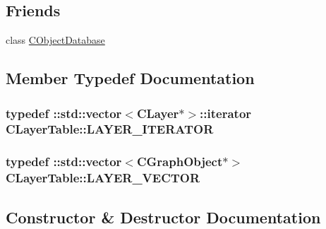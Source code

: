 \subsection*{Friends}
\begin{DoxyCompactItemize}
\item 
class \hyperlink{class_c_layer_table_a8451ee9e81bc51a04afb10dc6ee7e07e}{C\+Object\+Database}
\end{DoxyCompactItemize}


\subsection{Member Typedef Documentation}
\hypertarget{class_c_layer_table_ac3f5fb208ea83dd1d39e81301b7bdaaf}{}
\subsubsection[{L\+A\+Y\+E\+R\+\_\+\+I\+T\+E\+R\+A\+T\+O\+R}]{\setlength{\rightskip}{0pt plus 5cm}typedef \+::std\+::vector$<${\bf C\+Layer}$\ast$$>$\+::iterator {\bf C\+Layer\+Table\+::\+L\+A\+Y\+E\+R\+\_\+\+I\+T\+E\+R\+A\+T\+O\+R}}\label{class_c_layer_table_ac3f5fb208ea83dd1d39e81301b7bdaaf}
\hypertarget{class_c_layer_table_acd81eed52c55ccd6ba9fcbe3bd2451dc}{}
\subsubsection[{L\+A\+Y\+E\+R\+\_\+\+V\+E\+C\+T\+O\+R}]{\setlength{\rightskip}{0pt plus 5cm}typedef \+::std\+::vector$<${\bf C\+Graph\+Object}$\ast$$>$ {\bf C\+Layer\+Table\+::\+L\+A\+Y\+E\+R\+\_\+\+V\+E\+C\+T\+O\+R}}\label{class_c_layer_table_acd81eed52c55ccd6ba9fcbe3bd2451dc}


\subsection{Constructor \& Destructor Documentation}
\hypertarget{class_c_layer_table_a09fc2fd20604d02458fb271eea55c558}{}

